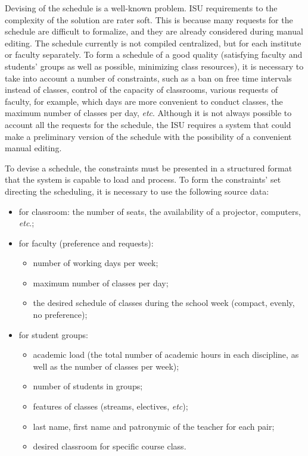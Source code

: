\documentclass[
]{aiitart}
\begin{document}
Devising of the schedule is a well-known problem.  ISU requirements to the complexity of the solution are rater soft. This is because many requests for the schedule are difficult to formalize, and they are already considered during manual editing. The schedule currently is not compiled centralized, but for each institute or faculty separately.%
To form a schedule of a good quality (satisfying faculty and students' groups as well as possible, minimizing class resources), it is necessary to take into account a number of constraints, such as a ban on free time intervals instead of classes, control of the capacity of classrooms, various requests of faculty, for example, which days are more convenient to conduct classes, the maximum number of classes per day, \emph{etc}.  Although it is not always possible to account all the requests for the schedule, the ISU requires a system that could make a preliminary version of the schedule with the possibility of a convenient manual editing.

To devise a schedule, the constraints must be presented in a structured format that the system is capable to load and process.  To form the constraints' set directing the scheduling, it is necessary to use the following source data:
\begin{itemize}
    \item for classroom: the number of seats, the availability of a projector, computers, \emph{etc}.;
    \item for faculty (preference and requests):
    \begin{itemize}
        \item number of working days per week;
        \item maximum number of classes per day;
        \item the desired schedule of classes during the school week (compact, evenly, no preference);
    \end{itemize}
    \item for student groups:
    \begin{itemize}
        \item academic load (the total number of academic hours in each discipline, as well as the number of classes per week);
        \item number of students in groups;
        \item features of classes (streams, electives, \emph{etc});
        \item last name, first name and patronymic of the teacher for each pair;
        \item desired classroom for specific course class.
    \end{itemize}
\end{itemize}
\end{document}
